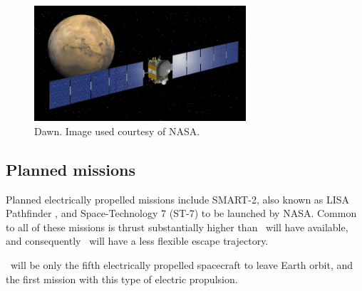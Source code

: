 \begin{figure}[ht]
\caption{Dawn. Image used courtesy of NASA.}
\label{fig:Dawn}
\centering
\includegraphics  [width=0.7\textwidth] {Images/mars-browse.jpg}
\end{figure}

\subsection{Planned missions}
Planned electrically propelled missions include SMART-2, also known as LISA Pathfinder \parencite{web_SMART-2}, and Space-Technology 7 (ST-7) to be launched by NASA. Common to all of these missions is thrust substantially higher than \BW\ will have available, and consequently \BW\ will have a less flexible escape trajectory.

\BW\ will be only the fifth electrically propelled spacecraft to leave Earth orbit, and the first mission with this type of electric propulsion.




